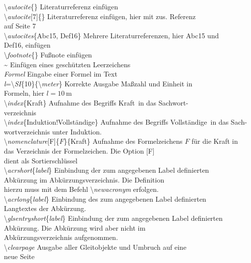 \begin{tabbing}
	\textbackslash \textit{autocite}\{\}	\> Literaturreferenz einfügen\\
	\textbackslash \textit{autocite}[7]\{\}	\> Literaturreferenz einfügen, hier mit zus. Referenz\\
	\> auf Seite 7\\
\textbackslash \textit{autocites}\{Abc15, Def16\}	\> Mehrere Literaturreferenzen, hier Abc15 und \\
\> Def16, einfügen\\
\textbackslash \textit{footnote}\{\}	\> Fußnote einfügen\\ 
\~{}	\> Einfügen eines geschützten Leerzeichens\\ 
\textdollar \textit{Formel} \textdollar	\> Eingabe einer Formel im Text\\
\textdollar\textit{l}=\textbackslash \textit{SI}\{10\}\{\textbackslash \textit{meter}\}\textdollar	\> Korrekte Ausgabe Maßzahl und Einheit in\\
\> Formeln, hier $l=\SI{10}{\meter}$\\
\textbackslash \textit{index}\{Kraft\} \> Aufnahme des Begriffs \glqq Kraft\grqq~in das Sachwort-  \\
\> verzeichnis\\
\textbackslash \textit{index}\{Induktion!Vollständige\} \> Aufnahme des Begriffs \glqq Vollständige\grqq~in das Sach-\\
\> wortverzeichnis unter \glqq Induktion\grqq.  \\
\textbackslash \textit{nomenclature}[F]\{$F$\}\{Kraft\}	\> Aufnahme des Formelzeichens $F$ für die Kraft in \\
\> das Verzeichnis der Formelzeichen. Die Option [F]\\
\>dient als Sortierschlüssel\\
\textbackslash \textit{acrshort}\{\textit{label}\} \> Einbindung der zum angegebenen Label definierten\\ \>  Abkürzung im Abkürzungsverzeichnis. Die Definition \\ \> hierzu muss mit dem Befehl \textbackslash \textit{newacronym} erfolgen.\\
\textbackslash \textit{acrlong}\{\textit{label}\} \> Einbindung des zum angegebenen Label definierten\\ \>  Langtextes der Abkürzung.\\
\textbackslash \textit{glsentryshort}\{\textit{label}\} \> Einbindung der zum angegebenen Label definierten\\ \>  Abkürzung. Die Abkürzung wird aber nicht im \\ \> Abkürzungsverzeichnis aufgenommen.\\
\textbackslash \textit{clearpage}	\> Ausgabe aller Gleitobjekte und Umbruch auf eine\\
\> neue Seite\\ 
\end{tabbing}

